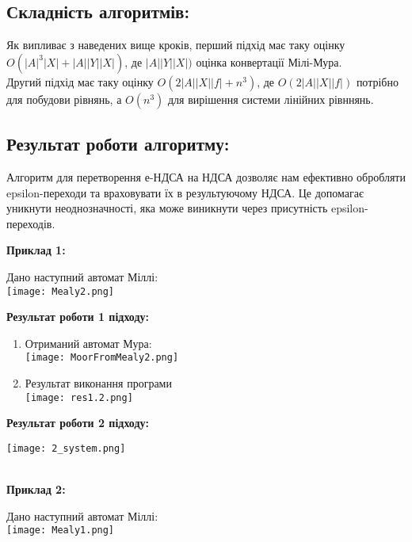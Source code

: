 \documentclass[12pt,a4paper]{article}
\begin{document}
\newpage

\subsection*{Складність алгоритмів:}
Як випливає з наведених вище кроків, перший підхід має таку оцінку  \( O(|A|^3|X| + |A||Y||X|) \), де \( |A||Y||X|) \) оцінка конвертації Мілі-Мура.
\\
Другий підхід має таку оцінку \( O(2|A||X||f| + n^3) \), де \( O(2|A||X||f|) \) потрібно для побудови рівнянь, а \( O(n^3) \) для вирішення системи лінійних рівннянь.

\subsection*{Результат роботи алгоритму:}

Алгоритм для перетворення е-НДСА на НДСА дозволяє нам ефективно обробляти epsilon-переходи та враховувати їх в результуючому НДСА. Це допомагає уникнути неоднозначності, яка може виникнути через присутність epsilon-переходів.

\vspace{1em}
\textbf{Приклад 1:}
\vspace{0.5em}

Дано наступний автомат Міллі:
\\
\texttt{[image: Mealy2.png]}

\textbf{Результат роботи 1 підходу:}

\begin{enumerate}
    \item Отриманий автомат Мура: \\
    \texttt{[image: MoorFromMealy2.png]}
    \item Результат виконання програми \\
    \texttt{[image: res1.2.png]}
\end{enumerate}

\textbf{Результат роботи 2 підходу:}

\texttt{[image: 2\_system.png]}

\\

\vspace{1em}
\textbf{Приклад 2:}
\vspace{0.5em}

Дано наступний автомат Міллі:
\\
\texttt{[image: Mealy1.png]}
\end{document}
